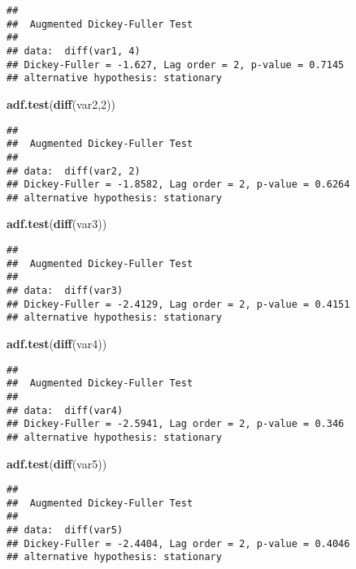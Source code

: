 \documentclass[]{article}
\newenvironment{Shaded}{\begin{snugshade}}{\end{snugshade}}
\newcommand{\KeywordTok}[1]{\textcolor[rgb]{0.13,0.29,0.53}{\textbf{{#1}}}}
\newcommand{\DecValTok}[1]{\textcolor[rgb]{0.00,0.00,0.81}{{#1}}}
\newcommand{\NormalTok}[1]{{#1}}
\begin{document}
\begin{verbatim}
## 
##  Augmented Dickey-Fuller Test
## 
## data:  diff(var1, 4)
## Dickey-Fuller = -1.627, Lag order = 2, p-value = 0.7145
## alternative hypothesis: stationary
\end{verbatim}

\begin{Shaded}
\begin{Highlighting}[]
\KeywordTok{adf.test}\NormalTok{(}\KeywordTok{diff}\NormalTok{(var2,}\DecValTok{2}\NormalTok{))}
\end{Highlighting}
\end{Shaded}

\begin{verbatim}
## 
##  Augmented Dickey-Fuller Test
## 
## data:  diff(var2, 2)
## Dickey-Fuller = -1.8582, Lag order = 2, p-value = 0.6264
## alternative hypothesis: stationary
\end{verbatim}

\begin{Shaded}
\begin{Highlighting}[]
\KeywordTok{adf.test}\NormalTok{(}\KeywordTok{diff}\NormalTok{(var3))}
\end{Highlighting}
\end{Shaded}

\begin{verbatim}
## 
##  Augmented Dickey-Fuller Test
## 
## data:  diff(var3)
## Dickey-Fuller = -2.4129, Lag order = 2, p-value = 0.4151
## alternative hypothesis: stationary
\end{verbatim}

\begin{Shaded}
\begin{Highlighting}[]
\KeywordTok{adf.test}\NormalTok{(}\KeywordTok{diff}\NormalTok{(var4))}
\end{Highlighting}
\end{Shaded}

\begin{verbatim}
## 
##  Augmented Dickey-Fuller Test
## 
## data:  diff(var4)
## Dickey-Fuller = -2.5941, Lag order = 2, p-value = 0.346
## alternative hypothesis: stationary
\end{verbatim}

\begin{Shaded}
\begin{Highlighting}[]
\KeywordTok{adf.test}\NormalTok{(}\KeywordTok{diff}\NormalTok{(var5))}
\end{Highlighting}
\end{Shaded}

\begin{verbatim}
## 
##  Augmented Dickey-Fuller Test
## 
## data:  diff(var5)
## Dickey-Fuller = -2.4404, Lag order = 2, p-value = 0.4046
## alternative hypothesis: stationary
\end{verbatim}
\end{document}
